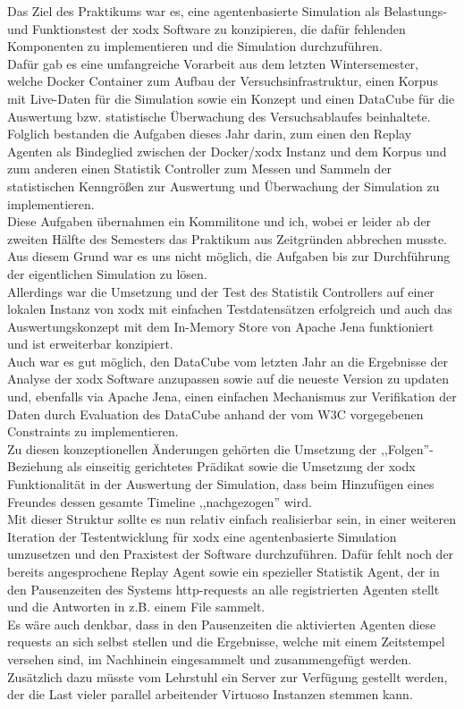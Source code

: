 \documentclass{article}
\begin{document}
Das Ziel des Praktikums war es, eine agentenbasierte Simulation als Belastungs- und Funktionstest der xodx Software zu konzipieren, die dafür fehlenden Komponenten zu implementieren und die Simulation durchzuführen.\\
Dafür gab es eine umfangreiche Vorarbeit aus dem letzten Wintersemester, welche Docker Container zum Aufbau der Versuchsinfrastruktur, einen Korpus mit Live-Daten für die Simulation sowie ein Konzept und einen DataCube für die Auswertung bzw. statistische Überwachung des Versuchsablaufes beinhaltete.\\
Folglich bestanden die Aufgaben dieses Jahr darin, zum einen den Replay Agenten als Bindeglied zwischen der Docker/xodx Instanz und dem Korpus und zum anderen einen Statistik Controller zum Messen und Sammeln der statistischen Kenngrößen zur Auswertung und Überwachung der Simulation zu implementieren.\\
Diese Aufgaben übernahmen ein Kommilitone und ich, wobei er leider ab der zweiten Hälfte des Semesters das Praktikum aus Zeitgründen abbrechen musste. Aus diesem Grund war es uns nicht möglich, die Aufgaben bis zur Durchführung der eigentlichen Simulation zu lösen.\\
Allerdings war die Umsetzung und der Test des Statistik Controllers auf einer lokalen Instanz von xodx mit einfachen Testdatensätzen erfolgreich und auch das Auswertungskonzept mit dem In-Memory Store von Apache Jena funktioniert und ist erweiterbar konzipiert.\\
Auch war es gut möglich, den DataCube vom letzten Jahr an die Ergebnisse der Analyse der xodx Software anzupassen sowie auf die neueste Version zu updaten und, ebenfalls via Apache Jena, einen einfachen Mechanismus zur Verifikation der Daten durch Evaluation des DataCube anhand der vom W3C vorgegebenen Constraints zu implementieren. \\
Zu diesen konzeptionellen Änderungen gehörten die Umsetzung der ,,Folgen''-Beziehung als einseitig gerichtetes Prädikat sowie die Umsetzung der xodx Funktionalität in der Auswertung der Simulation, dass beim Hinzufügen eines Freundes dessen gesamte Timeline ,,nachgezogen'' wird.\\
Mit dieser Struktur sollte es nun relativ einfach realisierbar sein, in einer weiteren Iteration der Testentwicklung für xodx eine agentenbasierte Simulation umzusetzen und den Praxistest der Software durchzuführen. Dafür fehlt noch der bereits angesprochene Replay Agent sowie ein spezieller Statistik Agent, der in den Pausenzeiten des Systems http-requests an alle registrierten Agenten stellt und die Antworten in z.B. einem File sammelt.\\
Es wäre auch denkbar, dass in den Pausenzeiten die aktivierten Agenten diese requests an sich selbst stellen und die Ergebnisse, welche mit einem Zeitstempel versehen sind, im Nachhinein eingesammelt und zusammengefügt werden.\\ 
Zusätzlich dazu müsste vom Lehrstuhl ein Server zur Verfügung gestellt werden, der die Last vieler parallel arbeitender Virtuoso Instanzen stemmen kann.

\newpage


\end{document}
